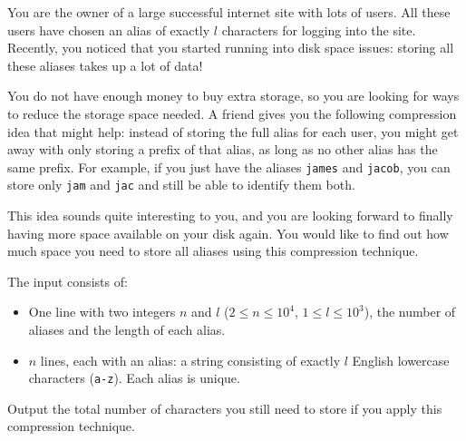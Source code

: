

\newcommand{\maxn}{10^4}
\newcommand{\maxl}{10^3}

You are the owner of a large successful internet site with lots of users.
All these users have chosen an alias of exactly $l$ characters for logging into the site.
Recently, you noticed that you started running into disk space issues:
storing all these aliases takes up a lot of data!

You do not have enough money to buy extra storage,
so you are looking for ways to reduce the storage space needed.
A friend gives you the following compression idea that might help:
instead of storing the full alias for each user,
you might get away with only storing a prefix of that alias,
as long as no other alias has the same prefix.
For example, if you just have the aliases \texttt{james} and \texttt{jacob},
you can store only \texttt{jam} and \texttt{jac} and still be able to identify them both.

This idea sounds quite interesting to you,
and you are looking forward to finally having more space available on your disk again.
You would like to find out how much space you need to store all aliases using this compression technique.

\begin{Input}
    The input consists of:
    \begin{itemize}
        \item One line with two integers $n$ and $l$ ($2 \le n \le \maxn$, $1 \le l \le \maxl$),
        the number of aliases and the length of each alias.
        \item $n$ lines, each with an alias:
        a string consisting of exactly $l$ English lowercase characters (\texttt{a-z}).
        Each alias is unique.
    \end{itemize}
\end{Input}

\begin{Output}
    Output the total number of characters you still need to store if you apply this compression technique.
\end{Output}
